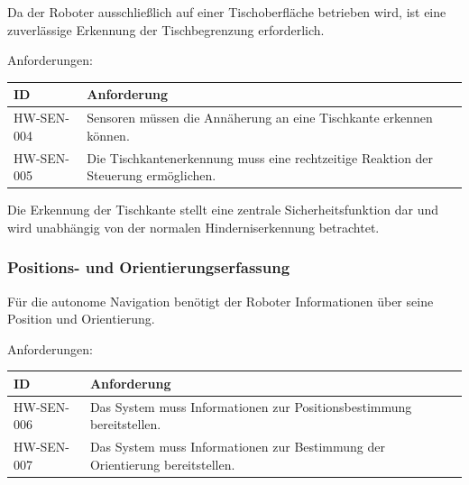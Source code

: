 \documentclass[
  a4paper,
  12pt,
  DIV=12,        %
  parskip=half,  %
  headings=small %
]{scrartcl}
\theoremstyle{definition}
\theoremstyle{definition}
\begin{document}
Da der Roboter ausschließlich auf einer Tischoberfläche betrieben wird,
ist eine zuverlässige Erkennung der Tischbegrenzung erforderlich.

Anforderungen:

\begin{longtable}[]{@{}
  >{\raggedright\arraybackslash}p{}
  >{\raggedright\arraybackslash}p{}@{}}
\toprule\noalign{}
\begin{minipage}[b]{\linewidth}\raggedright
ID
\end{minipage} & \begin{minipage}[b]{\linewidth}\raggedright
Anforderung
\end{minipage} \\
\midrule\noalign{}
\endhead
\bottomrule\noalign{}
\endlastfoot
HW-SEN-004 & Sensoren müssen die Annäherung an eine Tischkante erkennen
können. \\
HW-SEN-005 & Die Tischkantenerkennung muss eine rechtzeitige Reaktion
der Steuerung ermöglichen. \\
\end{longtable}

Die Erkennung der Tischkante stellt eine zentrale Sicherheitsfunktion
dar und wird unabhängig von der normalen Hinderniserkennung betrachtet.

\subsubsection{Positions- und
Orientierungserfassung}\label{positions--und-orientierungserfassung}

Für die autonome Navigation benötigt der Roboter Informationen über
seine Position und Orientierung.

Anforderungen:

\begin{longtable}[]{@{}
  >{\raggedright\arraybackslash}p{}
  >{\raggedright\arraybackslash}p{}@{}}
\toprule\noalign{}
\begin{minipage}[b]{\linewidth}\raggedright
ID
\end{minipage} & \begin{minipage}[b]{\linewidth}\raggedright
Anforderung
\end{minipage} \\
\midrule\noalign{}
\endhead
\bottomrule\noalign{}
\endlastfoot
HW-SEN-006 & Das System muss Informationen zur Positionsbestimmung
bereitstellen. \\
HW-SEN-007 & Das System muss Informationen zur Bestimmung der
Orientierung bereitstellen. \\
\end{longtable}
\end{document}

